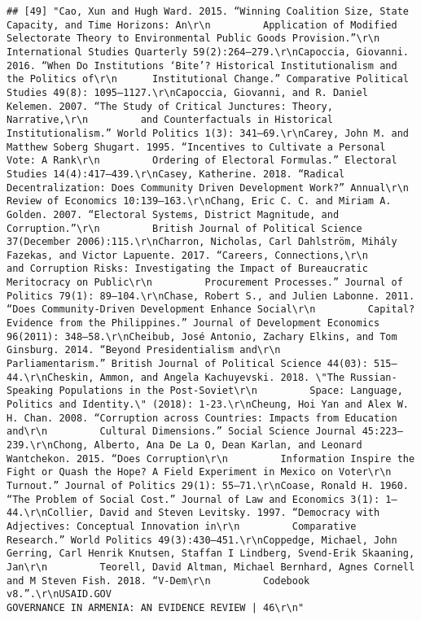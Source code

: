 \documentclass[
]{article}
\begin{document}
\begin{verbatim}
## [49] "Cao, Xun and Hugh Ward. 2015. “Winning Coalition Size, State Capacity, and Time Horizons: An\r\n         Application of Modified Selectorate Theory to Environmental Public Goods Provision.”\r\n         International Studies Quarterly 59(2):264–279.\r\nCapoccia, Giovanni. 2016. “When Do Institutions ‘Bite’? Historical Institutionalism and the Politics of\r\n      Institutional Change.” Comparative Political Studies 49(8): 1095–1127.\r\nCapoccia, Giovanni, and R. Daniel Kelemen. 2007. “The Study of Critical Junctures: Theory, Narrative,\r\n         and Counterfactuals in Historical Institutionalism.” World Politics 1(3): 341–69.\r\nCarey, John M. and Matthew Soberg Shugart. 1995. “Incentives to Cultivate a Personal Vote: A Rank\r\n         Ordering of Electoral Formulas.” Electoral Studies 14(4):417–439.\r\nCasey, Katherine. 2018. “Radical Decentralization: Does Community Driven Development Work?” Annual\r\n         Review of Economics 10:139–163.\r\nChang, Eric C. C. and Miriam A. Golden. 2007. “Electoral Systems, District Magnitude, and Corruption.”\r\n         British Journal of Political Science 37(December 2006):115.\r\nCharron, Nicholas, Carl Dahlström, Mihály Fazekas, and Victor Lapuente. 2017. “Careers, Connections,\r\n         and Corruption Risks: Investigating the Impact of Bureaucratic Meritocracy on Public\r\n         Procurement Processes.” Journal of Politics 79(1): 89–104.\r\nChase, Robert S., and Julien Labonne. 2011. “Does Community-Driven Development Enhance Social\r\n         Capital? Evidence from the Philippines.” Journal of Development Economics 96(2011): 348–58.\r\nCheibub, José Antonio, Zachary Elkins, and Tom Ginsburg. 2014. “Beyond Presidentialism and\r\n         Parliamentarism.” British Journal of Political Science 44(03): 515–44.\r\nCheskin, Ammon, and Angela Kachuyevski. 2018. \"The Russian-Speaking Populations in the Post-Soviet\r\n         Space: Language, Politics and Identity.\" (2018): 1-23.\r\nCheung, Hoi Yan and Alex W. H. Chan. 2008. “Corruption across Countries: Impacts from Education and\r\n         Cultural Dimensions.” Social Science Journal 45:223–239.\r\nChong, Alberto, Ana De La O, Dean Karlan, and Leonard Wantchekon. 2015. “Does Corruption\r\n         Information Inspire the Fight or Quash the Hope? A Field Experiment in Mexico on Voter\r\n         Turnout.” Journal of Politics 29(1): 55–71.\r\nCoase, Ronald H. 1960. “The Problem of Social Cost.” Journal of Law and Economics 3(1): 1–44.\r\nCollier, David and Steven Levitsky. 1997. “Democracy with Adjectives: Conceptual Innovation in\r\n         Comparative Research.” World Politics 49(3):430–451.\r\nCoppedge, Michael, John Gerring, Carl Henrik Knutsen, Staffan I Lindberg, Svend-Erik Skaaning, Jan\r\n         Teorell, David Altman, Michael Bernhard, Agnes Cornell and M Steven Fish. 2018. “V-Dem\r\n         Codebook v8.”.\r\nUSAID.GOV                                                     GOVERNANCE IN ARMENIA: AN EVIDENCE REVIEW | 46\r\n"                                                                                                                                                                                                                                                                                                                                        
\end{verbatim}
\end{document}
